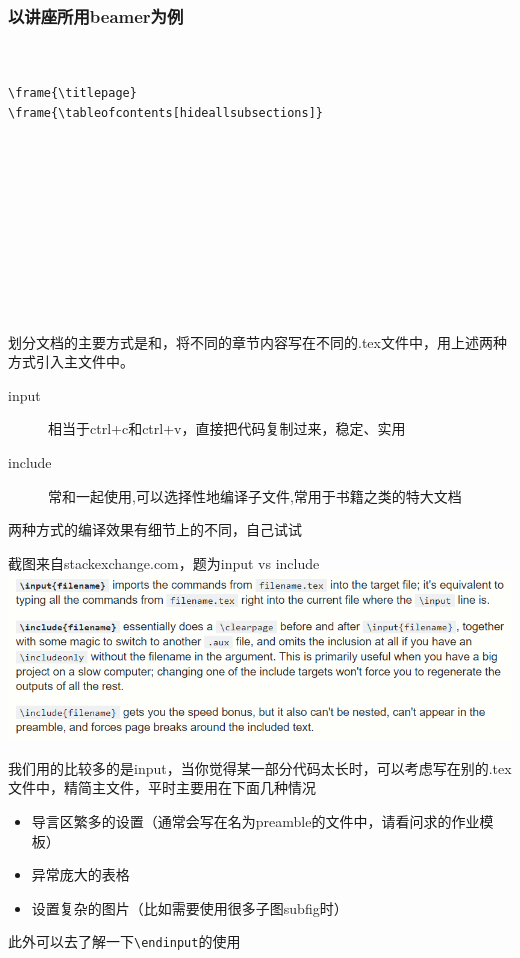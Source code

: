 	\begin{frame}[fragile]
	    \frametitle{以讲座所用beamer为例}
	    \vspace{-3ex}
\begin{lstlisting}


\frame{\titlepage}
\frame{\tableofcontents[hideallsubsections]}











\end{lstlisting}
	\end{frame}

	\begin{frame}[fragile]
		\indent 划分文档的主要方式是\verb||和\verb||，将不同的章节内容写在不同的.tex文件中，用上述两种方式引入主文件中。\\
		\begin{description}
			\item[input] 相当于ctrl+c和ctrl+v，直接把代码复制过来，稳定、实用
			\item[include] 常和\verb||一起使用,可以选择性地编译子文件,常用于书籍之类的特大文档
		\end{description}
		\indent 两种方式的编译效果有细节上的不同，自己试试
	\end{frame}

	\begin{frame}
	截图来自stackexchange.com，题为input vs include
	\includegraphics[width=\textwidth]{img//vs.png}	
	\end{frame}

	\begin{frame}[fragile]
		我们用的比较多的是input，当你觉得某一部分代码太长时，可以考虑写在别的.tex文件中，精简主文件，平时主要用在下面几种情况
		\begin{itemize}
			\item 导言区繁多的设置（通常会写在名为preamble的文件中，请看问求的作业模板）
			\item 异常庞大的表格
			\item 设置复杂的图片（比如需要使用很多子图subfig时）
		\end{itemize}
		此外可以去了解一下\verb|\endinput|的使用
	\end{frame}
